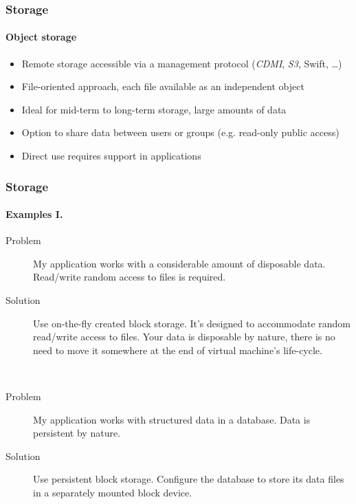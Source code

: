 \begin{frame}
  \frametitle{Storage}
  \framesubtitle{Object storage}

  \begin{itemize}
    \item Remote storage accessible via a management protocol
          (\textit{CDMI}, \textit{S3}, Swift, \dots)
    \item File-oriented approach, each file available as
          an independent object
    \item Ideal for mid-term to long-term storage, large
          amounts of data
    \item Option to share data between users or groups
          (e.g. read-only public access)
    \item Direct use requires support in applications
  \end{itemize}
\end{frame}

\begin{frame}
  \frametitle{Storage}
  \framesubtitle{Examples I.}

  \begin{description}
    \item[Problem] My application works with a considerable amount of disposable data. Read/write random access to files is required.
    \item[Solution] Use on-the-fly created block storage. It's designed to accommodate random read/write access to files. Your data
                    is disposable by nature, there is no need to move it somewhere at the end of virtual machine's life-cycle.
  \end{description}

  \hfill \\

  \begin{description}
    \item[Problem] My application works with structured data in a database. Data is persistent by nature.
    \item[Solution] Use persistent block storage. Configure the database to store its data files in a separately mounted block device.
  \end{description}
\end{frame}

